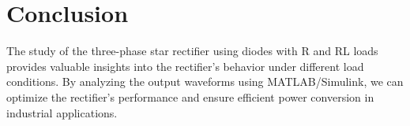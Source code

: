 \documentclass[12pt]{article}
\begin{document}
\section*{Conclusion}
The study of the three-phase star rectifier using diodes with R and RL loads provides valuable insights into the rectifier's behavior under different load conditions. By analyzing the output waveforms using MATLAB/Simulink, we can optimize the rectifier's performance and ensure efficient power conversion in industrial applications.


\renewcommand{\bibname}{References}

\end{document}
